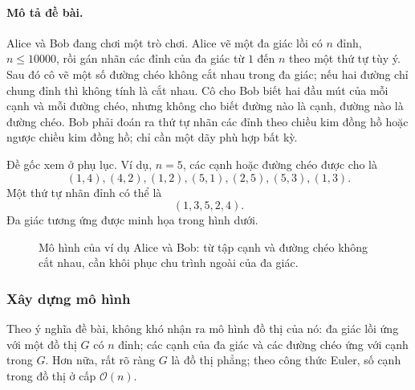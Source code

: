 \documentclass[11pt]{article}
\newcommand{\Oh}{\mathcal{O}}
\begin{document}
\paragraph{Mô tả đề bài.}
Alice và Bob đang chơi một trò chơi. Alice vẽ một đa giác lồi có \(n\) đỉnh,
\(n\le 10000\), rồi gán nhãn các đỉnh của đa giác từ \(1\) đến \(n\) theo một
thứ tự tùy ý. Sau đó cô vẽ một số đường chéo không cắt nhau trong đa giác;
nếu hai đường chỉ chung đỉnh thì không tính là cắt nhau. Cô cho Bob biết hai
đầu mút của mỗi cạnh và mỗi đường chéo, nhưng không cho biết đường nào là cạnh,
đường nào là đường chéo. Bob phải đoán ra thứ tự nhãn các đỉnh theo chiều kim
đồng hồ hoặc ngược chiều kim đồng hồ; chỉ cần một dãy phù hợp bất kỳ.

Đề gốc xem ở phụ lục. Ví dụ, \(n=5\), các cạnh hoặc đường chéo được cho là
\[
  (1,4),(4,2),(1,2),(5,1),(2,5),(5,3),(1,3).
\]
Một thứ tự nhãn đỉnh có thể là
\[
  (1,3,5,2,4).
\]
Đa giác tương ứng được minh họa trong hình dưới.

\begin{figure}[ht]
\centering
{}
\caption{Mô hình của ví dụ Alice và Bob: từ tập cạnh và đường chéo không cắt
nhau, cần khôi phục chu trình ngoài của đa giác.}
\end{figure}

\subsubsection{Xây dựng mô hình}

Theo ý nghĩa đề bài, không khó nhận ra mô hình đồ thị của nó: đa giác lồi ứng
với một đồ thị \(G\) có \(n\) đỉnh; các cạnh của đa giác và các đường chéo ứng
với cạnh trong \(G\). Hơn nữa, rất rõ ràng \(G\) là đồ thị phẳng; theo công
thức Euler, số cạnh trong đồ thị ở cấp \(\Oh(n)\).
\end{document}
